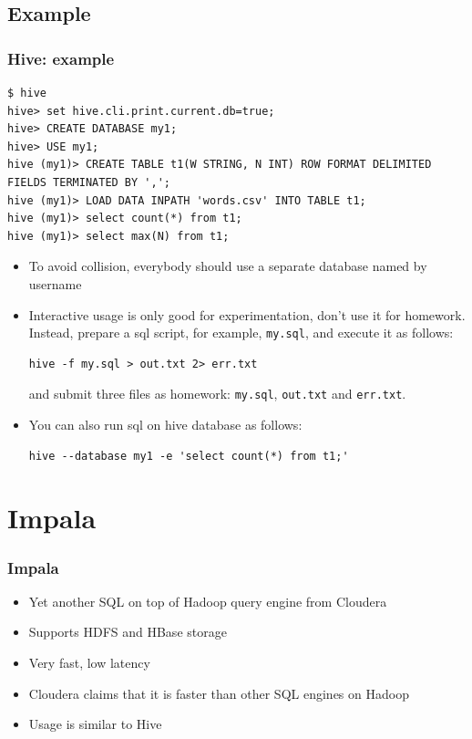 \documentclass{beamer}
\begin{document}
\subsection{Example}
\begin{frame}[fragile]
  \frametitle{Hive: example}
{\color{mycolorcode}
  \begin{lstlisting}[frame=single, basicstyle=\tiny]
$ hive
hive> set hive.cli.print.current.db=true;
hive> CREATE DATABASE my1;
hive> USE my1;
hive (my1)> CREATE TABLE t1(W STRING, N INT) ROW FORMAT DELIMITED FIELDS TERMINATED BY ',';
hive (my1)> LOAD DATA INPATH 'words.csv' INTO TABLE t1;
hive (my1)> select count(*) from t1;
hive (my1)> select max(N) from t1;
\end{lstlisting}
}
\begin{itemize}
\item To avoid collision, everybody should use a separate database named by username
\item Interactive usage is only good for experimentation, don't use it for homework. Instead, prepare
  a sql script, for example, {\color{mycolorcli}\verb|my.sql|}, and execute it as follows:
{\color{mycolorcli}
\begin{verbatim}
hive -f my.sql > out.txt 2> err.txt
\end{verbatim}
}
and submit three files as homework: {\color{mycolorcli}\verb|my.sql|}, {\color{mycolorcli}\verb|out.txt|} and 
{\color{mycolorcli}\verb|err.txt|}.
\item You can also run sql on hive database as follows:
{\color{mycolorcli}
\begin{verbatim}
hive --database my1 -e 'select count(*) from t1;'
\end{verbatim}
}
\end{itemize}


\end{frame}

\section{Impala}

\begin{frame}
 \frametitle{Impala}
 \begin{itemize}
  \item Yet another SQL on top of Hadoop query engine from Cloudera
  \item Supports HDFS and HBase storage
  \item Very fast, low latency
  \item Cloudera claims that it is faster than other SQL engines on Hadoop
  \item Usage is similar to Hive
 \end{itemize}
 
\end{frame}
\end{document}
